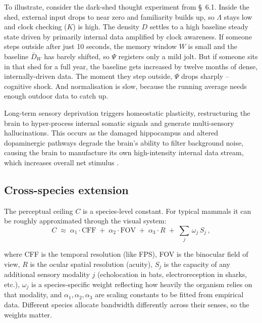 \documentclass[11pt,a4paper]{article}
\begin{document}
\medskip

To illustrate, consider the dark-shed thought experiment from \S~6.1. Inside the shed, external input drops to near zero and familiarity builds up, so $\Lambda$ stays low and clock checking ($K$) is high. The density $D$ settles to a high baseline steady state driven by primarily internal data amplified by clock awareness. If someone steps outside after just 10 seconds, the memory window $W$ is small and the baseline $\bar{D}_W$ has barely shifted, so $\Psi$ registers only a mild jolt. But if someone sits in that shed for a full year, the baseline gets increased by twelve months of dense, internally-driven data. The moment they step outside, $\Psi$ drops sharply -- cognitive shock. And normalisation is slow, because the running average needs enough outdoor data to catch up.

Long-term sensory deprivation triggers homeostatic plasticity, restructuring the brain to hyper-process internal somatic signals and generate multi-sensory hallucinations. This occurs as the damaged hippocampus and altered dopaminergic pathways degrade the brain's ability to filter background noise, causing the brain to manufacture its own high-intensity internal data stream, which increases overall net stimulus \citep{marazziti2026sensory}.

\subsection{Cross-species extension}

The perceptual ceiling $C$ is a species-level constant. For typical mammals it can be roughly approximated through the visual system:
\begin{equation}
	C \;\approx\; \alpha_1 \cdot \mathrm{CFF}
	\;+\; \alpha_2 \cdot \mathrm{FOV}
	\;+\; \alpha_3 \cdot R
	\;+\; \sum_{j}\,\omega_j\,S_j\,,
\end{equation}

where CFF is the temporal resolution (like FPS), FOV is the binocular field of view, $R$ is the ocular spatial resolution (acuity), $S_j$ is the capacity of any additional sensory modality $j$ (echolocation in bats, electroreception in sharks, etc.), $\omega_j$ is a species-specific weight reflecting how heavily the organism relies on that modality, and $\alpha_1, \alpha_2, \alpha_3$ are scaling constants to be fitted from empirical data. Different species allocate bandwidth differently across their senses, so the weights matter.
\end{document}
